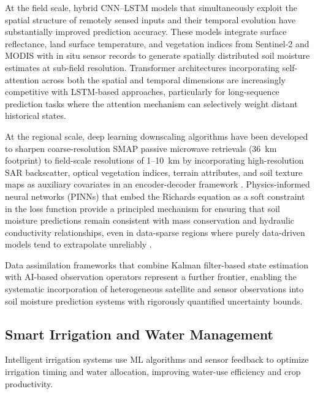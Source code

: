 \documentclass[land,article,submit,pdftex,moreauthors]{Definitions/mdpi}
\numberwithin{equation}{section}
\begin{document}
At the field scale, hybrid CNN--LSTM models that simultaneously exploit the spatial structure of remotely sensed inputs and their temporal evolution have substantially improved prediction accuracy. These models integrate surface reflectance, land surface temperature, and vegetation indices from Sentinel-2 and MODIS with in situ sensor records to generate spatially distributed soil moisture estimates at sub-field resolution. Transformer architectures incorporating self-attention across both the spatial and temporal dimensions are increasingly competitive with LSTM-based approaches, particularly for long-sequence prediction tasks where the attention mechanism can selectively weight distant historical states.

At the regional scale, deep learning downscaling algorithms have been developed to sharpen coarse-resolution SMAP passive microwave retrievals (36~km footprint) to field-scale resolutions of 1--10~km by incorporating high-resolution SAR backscatter, optical vegetation indices, terrain attributes, and soil texture maps as auxiliary covariates in an encoder-decoder framework \citep{fang2019deep}. Physics-informed neural networks (PINNs) that embed the Richards equation as a soft constraint in the loss function provide a principled mechanism for ensuring that soil moisture predictions remain consistent with mass conservation and hydraulic conductivity relationships, even in data-sparse regions where purely data-driven models tend to extrapolate unreliably \citep{karniadakis2021physics}.

Data assimilation frameworks that combine Kalman filter-based state estimation with AI-based observation operators represent a further frontier, enabling the systematic incorporation of heterogeneous satellite and sensor observations into soil moisture prediction systems with rigorously quantified uncertainty bounds.

\subsection{Smart Irrigation and Water Management}

Intelligent irrigation systems use ML algorithms and sensor feedback to optimize irrigation timing and water allocation, improving water-use efficiency and crop productivity.
\end{document}
